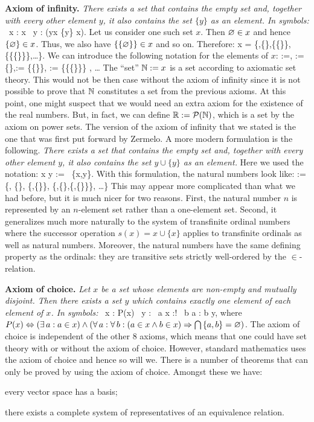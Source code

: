 \textbf{Axiom of infinity.} \emph{There exists a set that contains the empty set and,  together with every other element $y$, it also contains the set $\{y\}$ as an element. In symbols:}
\bse
\exists \, x : \vn \in x \land \forall \, y : (y\in x \imp \{y\} \in x).
\ese
Let us consider one such set $x$. Then $\varnothing \in x$ and hence $\{\varnothing\}\in x$. Thus, we also have $\{\{\varnothing\}\}\in x$ and so on. Therefore:
\bse
x = \{\vn,\{\vn\},\{\{\vn\}\},\{\{\{\vn\}\}\},\ldots\}.
\ese
We can introduce the following notation for the elements of $x$:
 :=\vn ,   := \{\vn\},:= \{\{\vn\}\}, := \{\{\{\vn\}\}\} , \quad \ldots
\ese
\bc
The ``set'' $\mathbb{N}:=x$\index{$\N$} is a set according to axiomatic set theory.
\ec
This would not be then case without the axiom of infinity since it is not possible to prove that $\N$ constitutes a set from the previous axioms.
\br
At this point, one might suspect that we would need an extra axiom for the existence of the real numbers. But, in fact, we can define $\mathbb{R} := \mathcal{P}(\mathbb{N})$, which is a set by the axiom on power sets.
\er
\br
\label{rem:natural_numbers_modern_form}
The version of the axiom of infinity that we stated is the one that was first put forward by Zermelo. A more modern formulation is the following. \emph{There exists a set that contains the empty set and, together with every other element $y$, it also contains the set $y\cup\{y\}$ as an element.} Here we used the notation:
\bse
x \cup y := \bigcup \, \{x,y\}.
\ese
With this formulation, the natural numbers look like:
\bse
\N := \{\vn, \{\vn\}, \{\vn,\{\vn\}\}, \{\vn,\{\vn\},\{\vn,\{\vn\}\}\}, \ldots \}
\ese
This may appear more complicated than what we had before, but it is much nicer for two reasons.  First, the natural number $n$ is represented by an $n$-element set rather than a one-element set. Second, it generalizes much more naturally to the system of transfinite ordinal numbers where the successor operation $s(x)=x\cup\{x\}$ applies to transfinite ordinals as well as natural numbers. Moreover, the natural numbers have the same defining property as the ordinals: they are transitive sets strictly well-ordered by the $\in$-relation.
\er

\textbf{Axiom of choice.} \emph{Let $x$ be a set whose elements are non-empty and mutually disjoint. Then there exists a set $y$ which contains exactly one element of each element of $x$. In symbols:}
\bse
\forall \, x : P(x) \imp \exists \, y : \forall \, a \in x :\exists! \, b \in a : b \in y,
\ese
where $P(x) \Leftrightarrow (\exists \,a : a \in x) \land (\forall \, a : \forall \, b : (a\in x \land b \in x) \Rightarrow \bigcap \, \{a,b\} = \varnothing )$.
\br
The axiom of choice is independent of the other 8 axioms, which means that one could have set theory with or without the axiom of choice. However, standard mathematics uses the axiom of choice and hence so will we. There is a number of theorems that can only be proved by using the axiom of choice. Amongst these we have:
\bit
\item every vector space has a basis;
\item there exists a complete system of representatives of an equivalence relation.
\eit
\er

